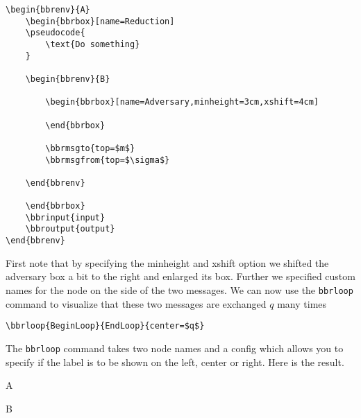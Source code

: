 \documentclass[a4paper]{report}
\begin{document}
\begin{lstlisting}
\begin{bbrenv}{A}
	\begin{bbrbox}[name=Reduction]
	\pseudocode{
		\text{Do something} 
	}

	\begin{bbrenv}{B}

		\begin{bbrbox}[name=Adversary,minheight=3cm,xshift=4cm]

		\end{bbrbox}
		
		\bbrmsgto{top=$m$}
		\bbrmsgfrom{top=$\sigma$}

	\end{bbrenv}

	\end{bbrbox}
	\bbrinput{input}
	\bbroutput{output}
\end{bbrenv}
\end{lstlisting}

First note that by specifying the minheight and xshift option we shifted the adversary box a bit to the right
and enlarged its box. Further we specified custom names for the node on the  side of the two messages. We
can now use the \lstinline$bbrloop$ command to visualize that these two messages are exchanged $q$ many times
\begin{lstlisting}
\bbrloop{BeginLoop}{EndLoop}{center=$q$}
\end{lstlisting}
The \lstinline$bbrloop$ command takes two node names and a config which allows you to specify if the label is
to be shown on the left, center or right. Here is the result.

\begin{bbrenv}{A}
	\begin{bbrbox}[name=Reduction]

	\begin{bbrenv}{B}

		\begin{bbrbox}[name=Adversary,minheight=3cm,xshift=4cm]

		\end{bbrbox}
		
		\bbrmsgspace{0.5cm}

	\end{bbrenv}

	\end{bbrbox}
\end{bbrenv}
\end{document}
